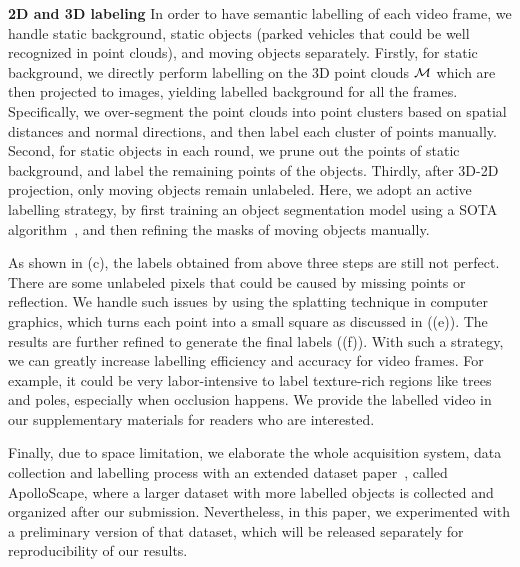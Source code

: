 \textbf{2D and 3D labeling}
In order to have semantic labelling of each video frame, we handle static background, static objects (\eg parked vehicles that could be well recognized in point clouds), and moving objects separately.
Firstly, for static background, we directly perform labelling on the 3D point clouds ${\mathcal M}$ which are then projected to images, yielding labelled background for all the frames.
Specifically, we over-segment the point clouds into point clusters based on spatial distances and normal directions, and then label each cluster of points manually.
Second, for static objects in each round, we prune out the points of static background, and label the remaining points of the objects.
Thirdly, after 3D-2D projection, only moving objects remain unlabeled. Here, we adopt an active labelling strategy, by first training an object segmentation model using a SOTA algorithm~\cite{WuSH16e}, and then refining the masks of moving objects manually.

As shown in (c), the labels obtained from above three steps are still not perfect. There are some unlabeled pixels that could be caused by missing points or reflection. We handle such issues by using the splatting technique in computer graphics, which turns each point into a small square as discussed in  ((e)). The results are further refined to generate the final labels ((f)).
With such a strategy, we can greatly increase labelling efficiency and accuracy for video frames. For example, it could be very labor-intensive to label texture-rich regions like trees and poles, especially when occlusion happens. We provide the labelled video in our supplementary materials for readers who are interested. 

Finally, due to space limitation, we elaborate the whole acquisition system, data collection and labelling process with an extended dataset paper~\cite{huang2018cvprw}, called ApolloScape, where a larger dataset with more labelled objects is collected and organized after our submission. 
Nevertheless, in this paper, we experimented with a preliminary version of that dataset, which will be released separately for reproducibility of our results.


